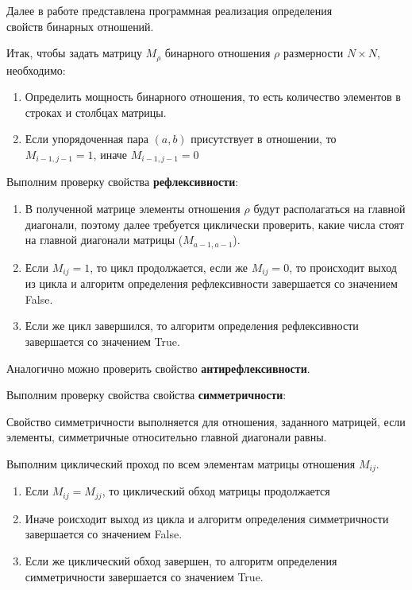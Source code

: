\documentclass[bachelor, och, labwork]{shiza}
\begin{document}
Далее в работе представлена программная реализация определения \\свойств 
бинарных отношений.

Итак, чтобы задать матрицу $M_\rho$ бинарного отношения $\rho$ размерности
$N \times N$, необходимо:

\begin{enumerate}

    \item Определить мощность бинарного отношения, то есть количество
    элементов в строках и столбцах матрицы.

    \item Если упорядоченная пара $(a, b)$ присутствует в отношении, то 
    $M_{i-1,j-1} = 1$, иначе $M_{i-1,j-1} = 0$

\end{enumerate}

Выполним проверку свойства \textbf{рефлексивности}:

\begin{enumerate}
    
    \item В полученной матрице элементы отношения $\rho$ будут располагаться на 
    главной диагонали, поэтому далее требуется циклически проверить, какие 
    числа стоят на главной диагонали матрицы ($M_{a-1,a-1}$).

    \item Если $M_{ij} = 1$, то цикл продолжается, если же $M_{ij} = 0$,
    то происходит выход из цикла и алгоритм определения рефлексивности
    завершается со значением False.

    \item Если же цикл завершился, то алгоритм определения рефлексивности
    завершается со значением True.

\end{enumerate}

Аналогично можно проверить свойство \textbf{антирефлексивности}.

Выполним проверку свойства свойства \textbf{симметричности}:

Свойство симметричности выполняется для отношения, заданного матрицей, если
элементы, симметричные относительно главной диагонали равны.

Выполним циклический проход по всем элементам матрицы отношения $M_{ij}$.

\begin{enumerate}
    
    \item Если $M_{ij} = M_{jj}$, то циклический обход матрицы продолжается
    
    \item Иначе роисходит выход из цикла и алгоритм определения симметричности
    завершается со значением False.

    \item Если же циклический обход завершен, то алгоритм определения 
    симметричности завершается со значением True.

\end{enumerate}
\end{document}
